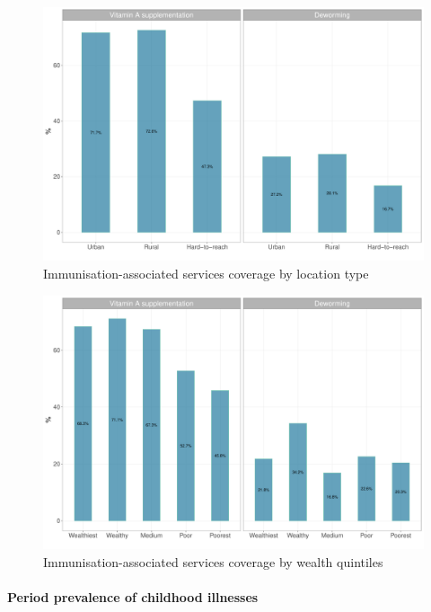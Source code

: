 \documentclass[12pt,a4paper]{article}
\let\oldparagraph\paragraph
\renewcommand{\paragraph}[1]{\oldparagraph{#1}\mbox{}}
\begin{document}
\begin{figure}[H]

{\centering \includegraphics{kayahReport_files/figure-latex/epi5plot-1} 

}

\caption{Immunisation-associated services coverage by location type}\label{fig:epi5plot}
\end{figure}

\begin{figure}[H]

{\centering \includegraphics{kayahReport_files/figure-latex/epi6plot-1} 

}

\caption{Immunisation-associated services coverage by wealth quintiles}\label{fig:epi6plot}
\end{figure}

\hypertarget{illness}{%
\paragraph{Period prevalence of childhood illnesses}\label{illness}}
\end{document}
